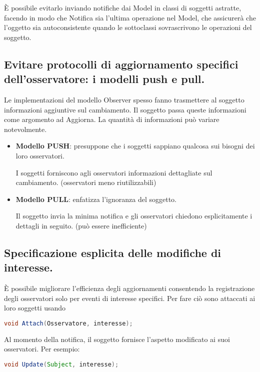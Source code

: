È possibile evitarlo inviando notifiche dai Model in classi di soggetti astratte, facendo in modo che Notifica sia l'ultima operazione nel Model, che assicurerà che l'oggetto sia autoconsistente quando le sottoclassi sovrascrivono le operazioni del soggetto.

\subsection{Evitare protocolli di aggiornamento specifici dell'osservatore: i modelli push e pull.}
Le implementazioni del modello Observer spesso fanno trasmettere al soggetto informazioni aggiuntive sul cambiamento. Il soggetto passa queste informazioni come argomento ad Aggiorna. La quantità di informazioni può variare notevolmente.

\begin{itemize}
    \item \textbf{Modello PUSH}: presuppone che i soggetti sappiano qualcosa sui bisogni dei loro osservatori.

    I soggetti forniscono agli osservatori informazioni dettagliate sul cambiamento. (osservatori meno riutilizzabili)

    \item \textbf{Modello PULL}: enfatizza l'ignoranza del soggetto.
    
    Il soggetto invia la minima notifica e gli osservatori chiedono esplicitamente i dettagli in seguito. (può essere inefficiente)
\end{itemize}

\subsection{Specificazione esplicita delle modifiche di interesse.}
È possibile migliorare l'efficienza degli aggiornamenti consentendo la registrazione degli osservatori solo per eventi di interesse specifici. Per fare ciò sono attaccati ai loro soggetti usando

\begin{lstlisting}[language=java]
   void Attach(Osservatore, interesse);
\end{lstlisting}

Al momento della notifica, il soggetto fornisce l'aspetto modificato ai suoi osservatori. Per esempio:

\begin{lstlisting}[language=java]
   void Update(Subject, interesse);
\end{lstlisting}

